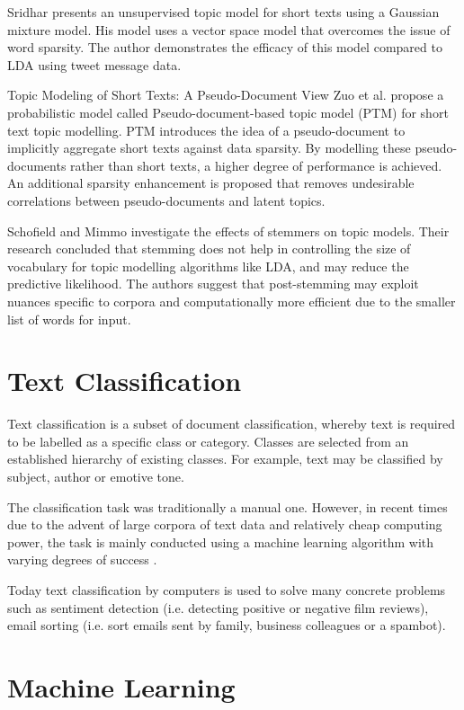 Sridhar \cite{sridhar2015unsupervised} presents an unsupervised topic model for short texts using a Gaussian mixture model. His model uses a vector space model that overcomes the issue of word sparsity. The author demonstrates the efficacy of this model compared to LDA using tweet message data.

Topic Modeling of Short Texts: A Pseudo-Document View Zuo et al. \cite{zuo2016topic} propose a probabilistic model called Pseudo-document-based topic model (PTM) for short text topic modelling. PTM introduces the idea of a pseudo-document to implicitly aggregate short texts against data sparsity. By modelling these pseudo-documents rather than short texts, a higher degree of performance is achieved. An additional sparsity enhancement is proposed that removes undesirable correlations between pseudo-documents and latent topics.

Schofield and Mimmo \cite{schofield2016comparing} investigate the effects of stemmers on topic models. Their research concluded that stemming does not help in controlling the size of vocabulary for topic modelling algorithms like LDA, and may reduce the predictive likelihood. The authors suggest that post-stemming may exploit nuances specific to corpora and computationally more efficient due to the smaller list of words for input.

\section{Text Classification}

Text classification is a subset of document classification, whereby text is required to be labelled as a specific class or category. Classes are selected from an established hierarchy of existing classes. For example, text may be classified by subject, author or emotive tone. 

The classification task was traditionally a manual one. However, in recent times due to the advent of large corpora of text data and relatively cheap computing power, the task is mainly conducted using a machine learning algorithm with varying degrees of success \cite{sebastiani2002machine}.  

Today text classification by computers is used to solve many concrete problems such as sentiment detection (i.e. detecting positive or negative film reviews), email sorting (i.e. sort emails sent by family, business colleagues or a spambot).

\section{Machine Learning}

